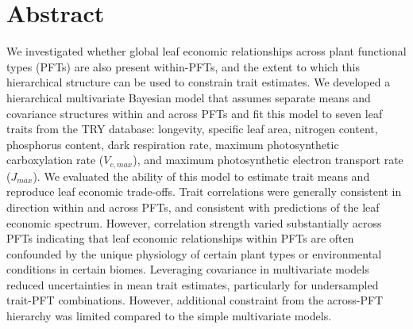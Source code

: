 \section{Abstract}
\label{sec:mvtraits-abstract}

We investigated whether global leaf economic relationships across plant functional types (PFTs) are also present within-PFTs, and the extent to which this hierarchical structure can be used to constrain trait estimates.
We developed a hierarchical multivariate Bayesian model that assumes separate means and covariance structures within and across PFTs and fit this model to seven leaf traits from the TRY database: longevity, specific leaf area, nitrogen content, phosphorus content, dark respiration rate, maximum photosynthetic carboxylation rate ($V_{c,max}$), and maximum photosynthetic electron transport rate ($J_{max}$). 
We evaluated the ability of this model to estimate trait means and reproduce leaf economic trade-offs.
Trait correlations were generally consistent in direction within and across PFTs, and consistent with predictions of the leaf economic spectrum.
However, correlation strength varied substantially across PFTs indicating that leaf economic relationships within PFTs are often confounded by the unique physiology of certain plant types or environmental conditions in certain biomes.
Leveraging covariance in multivariate models reduced uncertainties in mean trait estimates, particularly for undersampled trait-PFT combinations.
However, additional constraint from the across-PFT hierarchy was limited compared to the simple multivariate models.
